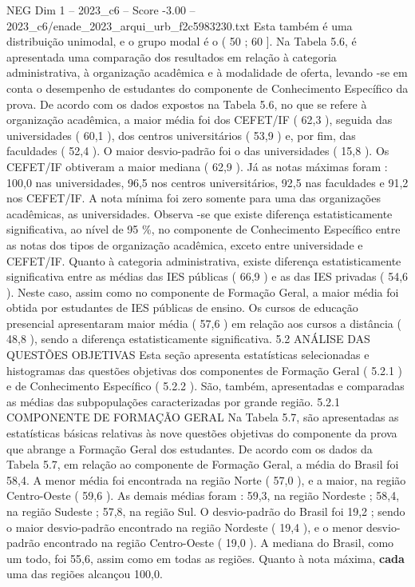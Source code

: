 \begin{textsample}{NEG Dim 1 – 2023\_c6 – Score -3.00 – 2023\_c6/enade\_2023\_arqui\_urb\_f2c5983230.txt}
Esta também é uma distribuição unimodal, e o grupo modal é o ( 50 ; 60 ].
Na Tabela 5.6, é apresentada uma comparação dos resultados em relação à categoria administrativa, à organização acadêmica e à modalidade de oferta, levando -se em conta o desempenho de estudantes do componente de Conhecimento Específico da prova.
De acordo com os dados expostos na Tabela 5.6, no que se refere à organização acadêmica, a maior média foi dos CEFET/IF ( 62,3 ), seguida das universidades ( 60,1 ), dos centros universitários ( 53,9 ) e, por fim, das faculdades ( 52,4 ).
O maior desvio-padrão foi o das universidades ( 15,8 ).
Os CEFET/IF obtiveram a maior mediana ( 62,9 ).
Já as notas máximas foram : 100,0 nas universidades, 96,5 nos centros universitários, 92,5 nas faculdades e 91,2 nos CEFET/IF.
A nota mínima foi zero somente para uma das organizações acadêmicas, as universidades.
Observa -se que existe diferença estatisticamente significativa, ao nível de 95 \%, no componente de Conhecimento Específico entre as notas dos tipos de organização acadêmica, exceto entre universidade e CEFET/IF.
Quanto à categoria administrativa, existe diferença estatisticamente significativa entre as médias das IES públicas ( 66,9 ) e as das IES privadas ( 54,6 ).
Neste caso, assim como no componente de Formação Geral, a maior média foi obtida por estudantes de IES públicas de ensino.
Os cursos de educação presencial apresentaram maior média ( 57,6 ) em relação aos cursos a distância ( 48,8 ), sendo a diferença estatisticamente significativa. 5.2 ANÁLISE DAS QUESTÕES OBJETIVAS Esta seção apresenta estatísticas selecionadas e histogramas das questões objetivas dos componentes de Formação Geral ( 5.2.1 ) e de Conhecimento Específico ( 5.2.2 ).
São, também, apresentadas e comparadas as médias das subpopulações caracterizadas por grande região. 5.2.1 COMPONENTE DE FORMAÇÃO GERAL Na Tabela 5.7, são apresentadas as estatísticas básicas relativas às nove questões objetivas do componente da prova que abrange a Formação Geral dos estudantes.
De acordo com os dados da Tabela 5.7, em relação ao componente de Formação Geral, a média do Brasil foi 58,4.
A menor média foi encontrada na região Norte ( 57,0 ), e a maior, na região Centro-Oeste ( 59,6 ).
As demais médias foram : 59,3, na região Nordeste ; 58,4, na região Sudeste ; 57,8, na região Sul.
O desvio-padrão do Brasil foi 19,2 ; sendo o maior desvio-padrão encontrado na região Nordeste ( 19,4 ), e o menor desvio-padrão encontrado na região Centro-Oeste ( 19,0 ).
A mediana do Brasil, como um todo, foi 55,6, assim como em todas as regiões.
Quanto à nota máxima, \textbf{cada} uma das regiões alcançou 100,0.

\end{textsample}
